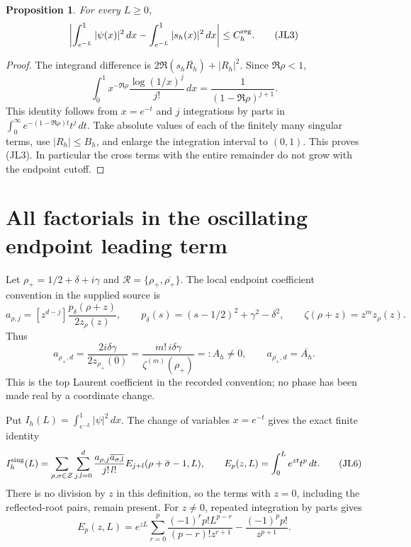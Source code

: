 \documentclass[11pt]{article}
\newtheorem{proposition}{Proposition}
\begin{document}
\begin{proposition}
For every \(L\ge0\),
\[
\left|\int_{e^{-L}}^1|\psi(x)|^2\,dx
      -\int_{e^{-L}}^1|s_h(x)|^2\,dx\right|
\le C_h^{\rm reg}.
\tag{JL3}
\]
\end{proposition}
\begin{proof}
The integrand difference is
\(2\Re(s_h\overline{R_h})+|R_h|^2\).  Since
\(\Re\rho<1\),
\[
\int_0^1 x^{-\Re\rho}\frac{\log(1/x)^j}{j!}\,dx
=\frac1{(1-\Re\rho)^{j+1}}.
\]
This identity follows from \(x=e^{-t}\) and \(j\) integrations by parts
in \(\int_0^\infty e^{-(1-\Re\rho)t}t^j\,dt\).
Take absolute values of each of the finitely many singular terms,
use \(|R_h|\le B_h\), and enlarge the integration interval to \((0,1)\).
This proves (JL3).  In particular the cross terms with the entire
remainder do not grow with the endpoint cutoff.
\end{proof}

\section{All factorials in the oscillating endpoint leading term}

Let
\(\rho_+=1/2+\delta+i\gamma\) and
\(\mathcal R=\{\rho_+,\overline{\rho_+}\}\).
The local endpoint coefficient convention in the supplied source is
\[
a_{\rho,j}=[z^{d-j}]
\frac{p_\delta(\rho+z)}{2z_\rho(z)},\qquad
p_\delta(s)=(s-1/2)^2+\gamma^2-\delta^2,\qquad
\zeta(\rho+z)=z^m z_\rho(z).
\tag{JL4}
\]
Thus
\[
a_{\rho_+,d}
=\frac{2i\delta\gamma}{2z_{\rho_+}(0)}
=\frac{m!\,i\delta\gamma}{\zeta^{(m)}(\rho_+)}
=:A_h\ne0,\qquad
a_{\overline{\rho_+},d}=\overline{A_h}.
\tag{JL5}
\]
This is the top Laurent coefficient in the recorded convention; no
phase has been made real by a coordinate change.

Put \(I_h(L)=\int_{e^{-L}}^1|\psi|^2\,dx\).
The change of variables \(x=e^{-t}\) gives the exact finite identity
\[
I_h^{\rm sing}(L)=
\sum_{\rho,\sigma\in\mathcal Z}\sum_{j,l=0}^d
\frac{a_{\rho,j}\overline{a_{\sigma,l}}}{j!\,l!}
E_{j+l}(\rho+\bar\sigma-1,L),\qquad
E_p(z,L)=\int_0^L e^{zt}t^p\,dt.
\tag{JL6}
\]
There is no division by \(z\) in this definition, so the terms with
\(z=0\), including the reflected-root pairs, remain present.
For \(z\ne0\), repeated integration by parts gives
\[
E_p(z,L)=e^{zL}\sum_{r=0}^p
\frac{(-1)^r p!L^{p-r}}{(p-r)!z^{r+1}}
-\frac{(-1)^p p!}{z^{p+1}}.
\tag{JL7}
\]
\end{document}
